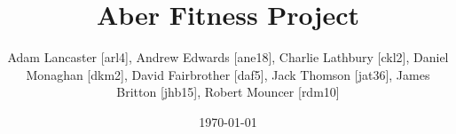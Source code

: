 \title{Aber Fitness Project}

\author{Adam Lancaster [arl4], Andrew Edwards [ane18], Charlie Lathbury [ckl2], Daniel Monaghan [dkm2], David Fairbrother [daf5], Jack Thomson [jat36], James Britton [jhb15], Robert Mouncer [rdm10]}


\date{\today} %


\maketitle



